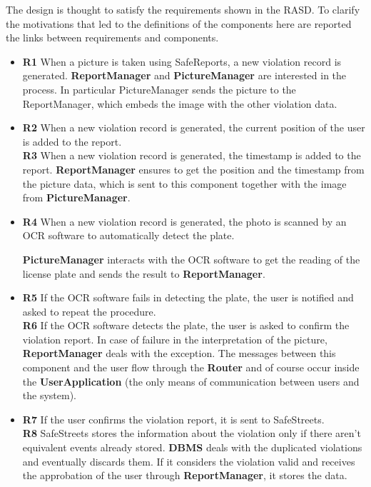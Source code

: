 \documentclass[./main.tex]{subfiles}
\begin{document}
The design is thought to satisfy the requirements shown in the RASD. To clarify the motivations that led to the definitions of the components here are reported the links between requirements and components.


\begin{itemize}
\item
  \textbf{R1} When a picture is taken using SafeReports, a new violation
  record is generated.
    \subitem 
    \textbf{ReportManager} and \textbf{PictureManager} are interested in the process. In particular PictureManager sends the picture to the ReportManager, which embeds the image with the other violation data.
  	
\item
  \textbf{R2} When a new violation record is generated, the current
  position of the user is added to the report.\\
  \textbf{R3} When a new violation record is generated, the timestamp is
  added to the report.
  \subitem
    \textbf{ReportManager} ensures to get the position and the timestamp from the picture data, which is sent to this component together with the image from \textbf{PictureManager}.
  
\item
  \textbf{R4} When a new violation record is generated, the photo is
  scanned by an OCR software to automatically detect the plate.
    
   \subitem
      \textbf{PictureManager} interacts with the OCR software to get the reading of the license plate and sends the result to \textbf{ReportManager}.
  
\item
  \textbf{R5} If the OCR software fails in detecting the plate, the user
  is notified and asked to repeat the procedure.\\
  \textbf{R6} If the OCR software detects the plate, the user is asked
  to confirm the violation report.
  \subitem
    In case of failure in the interpretation of the picture, \textbf{ReportManager} deals with the exception. The messages between this component and the user flow through the \textbf{Router} and of course occur inside the \textbf{UserApplication} (the only means of communication between users and the system).
  
\item
  \textbf{R7} If the user confirms the violation report, it is sent to
  SafeStreets.\\
  \textbf{R8} SafeStreets stores the information about the violation
  only if there aren't equivalent events already stored.
   \subitem
   \textbf{DBMS} deals with the duplicated violations and eventually discards them. If it considers the violation valid and receives the approbation of the user through \textbf{ReportManager}, it stores the data.
  
\end{itemize}
\end{document}
